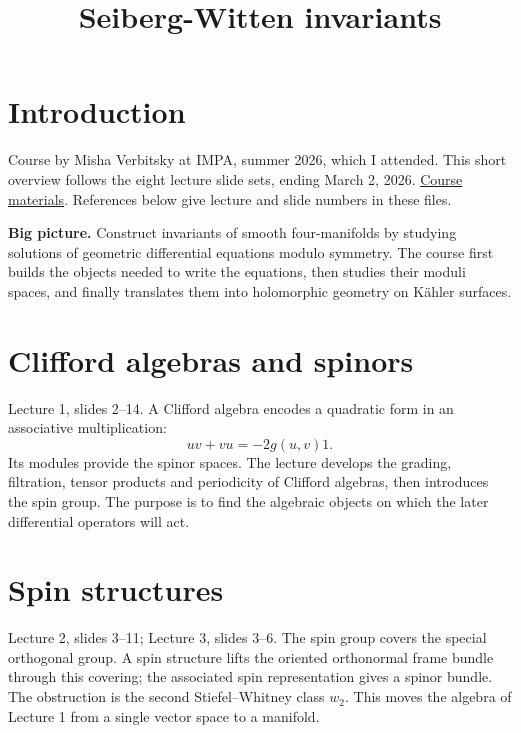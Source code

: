 

\title{Seiberg-Witten invariants}
\maketitle
\tableofcontents

\section{Introduction}
\label{section-introduction}

\noindent
Course by Misha Verbitsky at IMPA,
summer 2026, which I attended.
This short overview follows the eight
lecture slide sets, ending March 2, 2026.
\href{http://verbit.ru/IMPA/SW-2026/}
{Course materials}.
References below give lecture and slide
numbers in these files.

\medskip\noindent
{\bf Big picture.}
Construct invariants of smooth
four-manifolds by studying solutions of
geometric differential equations modulo
symmetry. The course first builds the
objects needed to write the equations,
then studies their moduli spaces, and
finally translates them into holomorphic
geometry on K\"ahler surfaces.

\section{Clifford algebras and spinors}
\label{section-clifford}

\noindent
Lecture 1, slides 2--14.
A Clifford algebra encodes a quadratic
form in an associative multiplication:
$$
uv+vu=-2g(u,v)1.
$$
Its modules provide the spinor spaces.
The lecture develops the grading,
filtration, tensor products and
periodicity of Clifford algebras, then
introduces the spin group.
The purpose is to find the algebraic
objects on which the later differential
operators will act.

\section{Spin structures}
\label{section-spin}

\noindent
Lecture 2, slides 3--11;
Lecture 3, slides 3--6.
The spin group covers the special
orthogonal group. A spin structure lifts
the oriented orthonormal frame bundle
through this covering; the associated
spin representation gives a spinor bundle.
The obstruction is the second
Stiefel--Whitney class $w_2$.
This moves the algebra of Lecture 1 from
a single vector space to a manifold.

